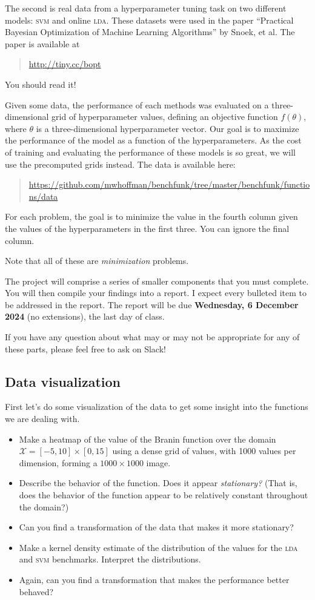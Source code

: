 \documentclass{article}
\newcommand{\acro}[1]{\textsc{\MakeLowercase{#1}}}
\newcommand{\mc}[1]{\mathcal{#1}}
\begin{document}
The second is real data from a hyperparameter tuning task on two different
models: \acro{SVM} and online \acro{LDA}. These datasets were used in the paper
``Practical Bayesian Optimization of Machine Learning Algorithms'' by Snoek, et
al. The paper is available at
\begin{quote}
  \url{http://tiny.cc/bopt}
\end{quote}
You should read it!

Given some data, the performance of each methods was evaluated on a
three-dimensional grid of hyperparameter values, defining an objective function
$f(\theta)$, where $\theta$ is a three-dimensional hyperparameter vector. Our
goal is to maximize the performance of the model as a function of the
hyperparameters.  As the cost of training and evaluating the performance of
these models is so great, we will use the precomputed grids instead. The data is
available here:
\begin{quote}
  \url{https://github.com/mwhoffman/benchfunk/tree/master/benchfunk/functions/data}
\end{quote}
For each problem, the goal is to minimize the value in the fourth column given
the values of the hyperparameters in the first three. You can ignore the final
column.

Note that all of these are \emph{minimization} problems.

The project will comprise a series of smaller components that you must
complete. You will then compile your findings into a report. I expect every
bulleted item to be addressed in the report. The report will be due
\textbf{Wednesday, 6 December 2024} (no extensions), the last day of class.

If you have any question about what may or may not be appropriate for any of
these parts, please feel free to ask on Slack!

\subsection*{Data visualization}

First let's do some visualization of the data to get some insight into the
functions we are dealing with.

\begin{itemize}
\item
  Make a heatmap of the value of the Branin function over the domain $\mc{X} =
  [-5, 10] \times [0, 15]$ using a dense grid of values, with 1000 values per
  dimension, forming a $1000 \times 1000$ image.
\item
  Describe the behavior of the function. Does it appear \emph{stationary?} (That
  is, does the behavior of the function appear to be relatively constant
  throughout the domain?)
\item Can you find a transformation of the data that makes it more stationary?
\item
  Make a kernel density estimate of the distribution of the values for the
  \acro{LDA} and \acro{SVM} benchmarks. Interpret the distributions.
\item
  Again, can you find a transformation that makes the performance better
  behaved?
\end{itemize}
\end{document}
